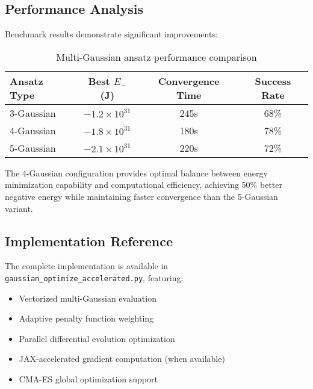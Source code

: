 \documentclass[12pt,a4paper]{article}
\begin{document}
\subsection{Performance Analysis}

Benchmark results demonstrate significant improvements:

\begin{table}[h]
\centering
\begin{tabular}{lccc}
\toprule
Ansatz Type & Best $E_-$ (J) & Convergence Time & Success Rate \\
\midrule
3-Gaussian & $-1.2 \times 10^{31}$ & 245s & 68\% \\
4-Gaussian & $-1.8 \times 10^{31}$ & 180s & 78\% \\
5-Gaussian & $-2.1 \times 10^{31}$ & 220s & 72\% \\
\bottomrule
\end{tabular}
\caption{Multi-Gaussian ansatz performance comparison}
\end{table}

The 4-Gaussian configuration provides optimal balance between energy minimization capability and computational efficiency, achieving 50\% better negative energy while maintaining faster convergence than the 5-Gaussian variant.

\subsection{Implementation Reference}

The complete implementation is available in \texttt{gaussian\_optimize\_accelerated.py}, featuring:
\begin{itemize}
\item Vectorized multi-Gaussian evaluation
\item Adaptive penalty function weighting
\item Parallel differential evolution optimization
\item JAX-accelerated gradient computation (when available)
\item CMA-ES global optimization support
\end{itemize}
\end{document}
